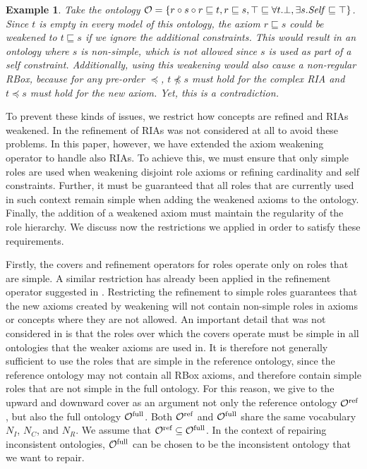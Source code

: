 \documentclass[
]{ceurart}
\newtheorem{example}{Example}
\begin{document}
\begin{example}
  Take the ontology $\mathcal{O} = \{ r \circ s \circ r \sqsubseteq t, r \sqsubseteq s, \top \sqsubseteq \forall t.\bot, \exists s.\mathit{Self} \sqsubseteq \top \}$. Since $t$ is empty in every model of this ontology, the axiom $r \sqsubseteq s$ could be weakened to $t \sqsubseteq s$ if we ignore the additional constraints. This would result in an ontology where $s$ is non-simple, which is not allowed since $s$ is used as part of a self constraint.
  Additionally, using this weakening would also cause a non-regular RBox, because for any pre-order $\preceq$, $t \not\preceq s$ must hold for the complex RIA and $t \preceq s$ must hold for the new axiom. Yet, this is a contradiction.
\end{example}

To prevent these kinds of issues, we restrict how concepts are refined and RIAs weakened. In \cite{confalonieri2020towards} the refinement of RIAs was not considered at all to avoid these problems. In this paper, however, we have extended the axiom weakening operator to handle also RIAs. To achieve this, we must ensure that only simple roles are used when weakening disjoint role axioms or refining cardinality and self constraints. Further, it must be guaranteed that all roles that are currently used in such context remain simple when adding the weakened axioms to the ontology. Finally, the addition of a weakened axiom must maintain the regularity of the role hierarchy. We discuss now the restrictions we applied in order to satisfy these requirements.

Firstly, the covers and refinement operators for roles operate only on roles that are simple. A similar restriction has already been applied in the refinement operator suggested in \cite{confalonieri2020towards}. Restricting the refinement to simple roles guarantees that the new axioms created by weakening will not contain non-simple roles in axioms or concepts where they are not allowed. An important detail that was not considered in \cite{confalonieri2020towards} is that the roles over which the covers operate must be simple in all ontologies that the weaker axioms are used in. It is therefore not generally sufficient to use the roles that are simple in the reference ontology, since the reference ontology may not contain all RBox axioms, and therefore contain simple roles that are not simple in the full ontology. For this reason, we give to the upward and downward cover as an argument not only the reference ontology ${\mathcal{O}^\textnormal{ref}}$, but also the full ontology ${\mathcal{O}^\textnormal{full}}$. Both ${\mathcal{O}^\textnormal{ref}}$ and ${\mathcal{O}^\textnormal{full}}$ share the same vocabulary $N_I$, $N_C$, and $N_R$. We assume that ${\mathcal{O}^\textnormal{ref}} \subseteq {\mathcal{O}^\textnormal{full}}$. In the context of repairing inconsistent ontologies, ${\mathcal{O}^\textnormal{full}}$ can be chosen to be the inconsistent ontology that we want to repair.
\end{document}
